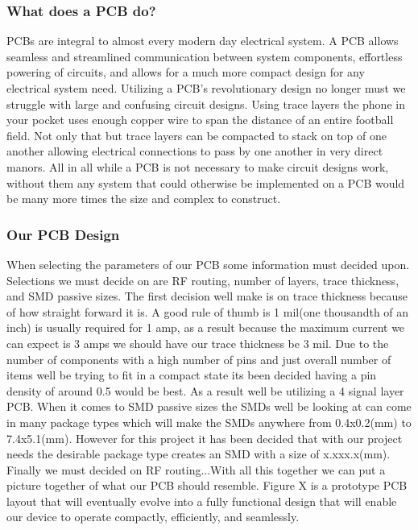 \subsubsection{What does a PCB do?}
PCBs are integral to almost every modern day electrical system. A PCB allows seamless and streamlined communication between system components, effortless powering of circuits, and allows for a much more compact design for any electrical system need. Utilizing a PCB's revolutionary design no longer must we struggle with large and confusing circuit designs. Using trace layers the phone in your pocket uses enough copper wire to span the distance of an entire football field. Not only that but trace layers can be compacted to stack on top of one another allowing electrical connections to pass by one another in very direct manors. All in all while a PCB is not necessary to make circuit designs work, without them any system that could otherwise be implemented on a PCB would be many more times the size and complex to construct.
\subsubsection{Our PCB Design}
When selecting the parameters of our PCB some information must decided upon. Selections we must decide on are RF routing, number of layers, trace thickness, and SMD passive sizes. The first decision well make is on trace thickness because of how straight forward it is. A good rule of thumb is 1 mil(one thousandth of an inch) is usually required for 1 amp, as a result because the maximum current we can expect is 3 amps we should have our trace thickness be 3 mil. Due to the number of components with a high number of pins and just overall number of items well be trying to fit in a compact state its been decided having a pin density of around 0.5 would be best. As a result well be utilizing a 4 signal layer PCB. When it comes to SMD passive sizes the SMDs well be looking at can come in many package types which will make the SMDs anywhere from 0.4x0.2(mm) to 7.4x5.1(mm). However for this project it has been decided that with our project needs the desirable package type creates an SMD with a size of x.xxx.x(mm). Finally we must decided on RF routing...With all this together we can put a picture together of what our PCB should resemble. Figure X is a prototype PCB layout that will eventually evolve into a fully functional design that will enable our device to operate compactly, efficiently, and seamlessly.